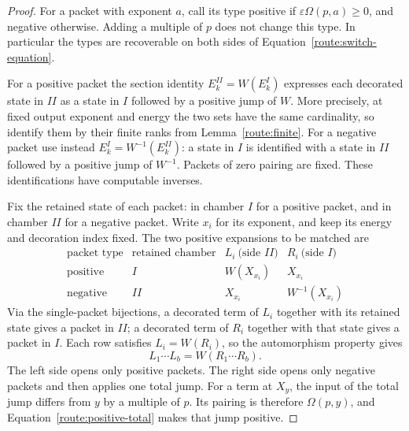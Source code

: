\begin{proof}
For a packet with exponent $a$, call its type positive if
$\varepsilon\Omega(p,a)\geq0$, and negative otherwise.  Adding a
multiple of $p$ does not change this type.  In particular the types
are recoverable on both sides of Equation~\eqref{route:switch-equation}.

For a positive packet the section identity $E_k^{II}=W(E_k^I)$
expresses each decorated state in $II$ as a state in $I$ followed by
a positive jump of $W$.  More precisely, at fixed output exponent
and energy the two sets have the same cardinality, so identify them
by their finite ranks from Lemma~\ref{route:finite}.  For a negative
packet use instead $E_k^I=W^{-1}(E_k^{II})$: a state in $I$ is
identified with a state in $II$ followed by a positive jump of
$W^{-1}$.  Packets of zero pairing are fixed.  These identifications
have computable inverses.

Fix the retained state of each packet: in chamber $I$ for a positive
packet, and in chamber $II$ for a negative packet. Write $x_i$ for
its exponent, and keep its energy and decoration index fixed.
The two positive expansions to be matched are
\[
\begin{array}{c|c|c|c}
\text{packet type}&\text{retained chamber}&
 L_i\ \text{(side $II$)}&R_i\ \text{(side $I$)}\\ \hline
\text{positive}&I&W(X_{x_i})&X_{x_i}\\
\text{negative}&II&X_{x_i}&W^{-1}(X_{x_i})
\end{array}
\]
Via the single-packet bijections, a decorated term of $L_i$ together
with its retained state gives a packet in $II$; a decorated term of
$R_i$ together with that state gives a packet in $I$.
Each row satisfies $L_i=W(R_i)$, so the automorphism property gives
\begin{equation}
 \label{route:automorphism}
 L_1\cdots L_b=W(R_1\cdots R_b).
\end{equation}
The left side opens only positive packets. The right side opens only
negative packets and then applies one total jump. For a term at
$X_y$, the input of the total jump differs from $y$ by a multiple
of $p$. Its pairing is therefore $\Omega(p,y)$, and
Equation~\eqref{route:positive-total} makes that jump positive.


\end{proof}

